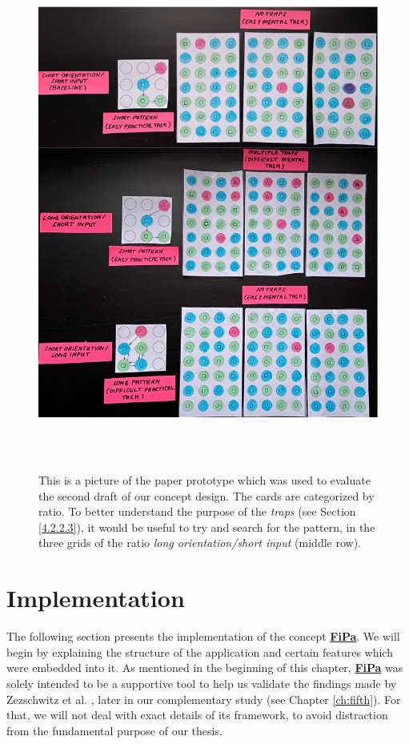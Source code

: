 \begin{figure}[H]
\centering
\includegraphics[width=15cm, height=17cm]{Chapters/graphics/paperprototype.PNG}
\caption{This is a picture of the paper prototype which was used to evaluate the second draft of our concept design. The cards are categorized by ratio. To better understand the purpose of the \textit{traps} (see Section \ref{4.2.2.3}), it would be useful to try and search for the pattern, in the three grids of the ratio \textit{long orientation/short input} (middle row).}
\label{fig:paperprototype}
\end{figure}

   
\section{Implementation} \label{4.3}

The following section presents the implementation of the concept \underline{\textbf{FiPa}}. We will begin by explaining the structure of the application and certain features which were embedded into it. As mentioned in the beginning of this chapter, \underline{\textbf{FiPa}} was solely intended to be a supportive tool to help us validate the findings made by Zezschwitz et al. \cite{Zezschwitz}, later in our complementary study (see Chapter \ref{ch:fifth}). For that, we will not deal with exact details of its framework, to avoid distraction from the fundamental purpose of our thesis.\\

